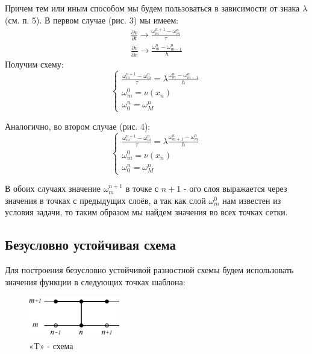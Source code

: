\documentclass[titlepage]{article}
\def\part{\partial}
\begin{document}
Причем тем или иным способом мы будем пользоваться в зависимости от знака $\lambda$ (см. п. 5).
В первом случае (рис. 3) мы имеем:
\begin{gather*}
	\frac{\part v}{\part t} \to \frac{\omega_m^{n+1} - \omega_m^n}{\tau}
	\\
	\frac{\part v}{\part x} \to \frac{\omega_m^n - \omega_{m-1}^n}{h}
\end{gather*}
Получим схему:
\begin{equation}
 \tag{A}
 \begin{cases}
 	\frac{\omega_m^{n+1} - \omega_m^n}{\tau} = \lambda\frac{\omega_m^n - \omega_{m-1}^n}{h}
 	\\
	\omega_m^0 = \nu(x_n)
	\\	
	\omega_0^n = \omega_M^n
 \end{cases}
\end{equation}

Аналогично, во втором случае (рис. 4):
\begin{equation}
 \tag{B}
 \begin{cases}
 	\frac{\omega_m^{n+1} - \omega_m^n}{\tau} = \lambda\frac{\omega_{m+1}^n - \omega_{m}^n}{h}
 	\\
	\omega_m^0 = \nu(x_n)
	\\	
	\omega_0^n = \omega_M^n
 \end{cases}
\end{equation}

В обоих случаях значение $\omega_m^{n+1}$ в точке с $n+1$ - ого слоя выражается через значения в точках с предыдущих слоёв, а так как слой $\omega_m^0$ нам известен из условия задачи, то таким образом мы найдем значения во всех точках сетки. 

\subsection{Безусловно устойчивая схема}
Для построения безусловно устойчивой разностной схемы будем использовать значения функции в следующих точках шаблона: 
\begin{figure}[h]
\center
\includegraphics[width = 40mm]{img5.pdf}
\caption{«T» - схема}
\end{figure}
\end{document}
